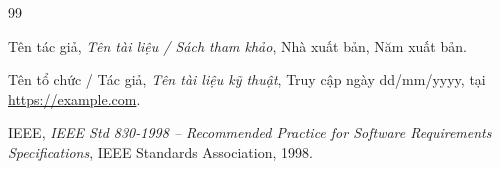 \documentclass[12pt, a4paper]{report}
\begin{document}

\clearpage


\clearpage


\clearpage


\clearpage


\clearpage


\clearpage


\clearpage


\clearpage

\begin{thebibliography}{99}
  \raggedright

  Tên tác giả,
  \textit{Tên tài liệu / Sách tham khảo},
  Nhà xuất bản, Năm xuất bản.

  Tên tổ chức / Tác giả,
  \textit{Tên tài liệu kỹ thuật},
  Truy cập ngày dd/mm/yyyy, tại \url{https://example.com}.

  IEEE, \textit{IEEE Std 830-1998 -- Recommended Practice for Software Requirements Specifications}, IEEE Standards Association, 1998.

\end{thebibliography}
\end{document}
